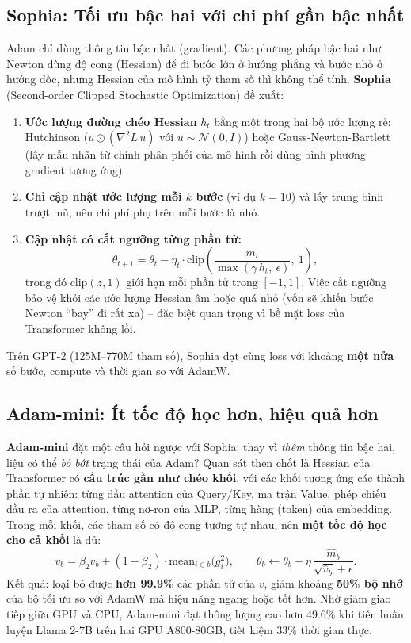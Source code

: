 \subsection{Sophia: Tối ưu bậc hai với chi phí gần bậc nhất}
\label{ssec:sophia}
Adam chỉ dùng thông tin bậc nhất (gradient). Các phương pháp bậc hai như Newton dùng độ cong (Hessian) để đi bước lớn ở hướng phẳng và bước nhỏ ở hướng dốc, nhưng Hessian của mô hình tỷ tham số thì không thể tính. \textbf{Sophia} (Second-order Clipped Stochastic Optimization) \cite{liu2024sophia} đề xuất:
\begin{enumerate}
	\item \textbf{Ước lượng đường chéo Hessian} $h_t$ bằng một trong hai bộ ước lượng rẻ: Hutchinson ($u \odot (\nabla^2 L\, u)$ với $u \sim \mathcal{N}(0, I)$) hoặc Gauss-Newton-Bartlett (lấy mẫu nhãn từ chính phân phối của mô hình rồi dùng bình phương gradient tương ứng).
	\item \textbf{Chỉ cập nhật ước lượng mỗi $k$ bước} (ví dụ $k = 10$) và lấy trung bình trượt mũ, nên chi phí phụ trên mỗi bước là nhỏ.
	\item \textbf{Cập nhật có cắt ngưỡng từng phần tử:}
	\begin{equation}
		\theta_{t+1} = \theta_t - \eta_t \cdot \text{clip}\left(\frac{m_t}{\max(\gamma\, h_t,\ \epsilon)},\ 1\right),
	\end{equation}
	trong đó $\text{clip}(z, 1)$ giới hạn mỗi phần tử trong $[-1, 1]$. Việc cắt ngưỡng bảo vệ khỏi các ước lượng Hessian âm hoặc quá nhỏ (vốn sẽ khiến bước Newton “bay” đi rất xa) -- đặc biệt quan trọng vì bề mặt loss của Transformer không lồi.
\end{enumerate}
Trên GPT-2 (125M--770M tham số), Sophia đạt cùng loss với khoảng \textbf{một nửa} số bước, compute và thời gian so với AdamW.

\subsection{Adam-mini: Ít tốc độ học hơn, hiệu quả hơn}
\label{ssec:adam_mini}
\textbf{Adam-mini} \cite{zhang2025adammini} đặt một câu hỏi ngược với Sophia: thay vì \emph{thêm} thông tin bậc hai, liệu có thể \emph{bỏ bớt} trạng thái của Adam? Quan sát then chốt là Hessian của Transformer có \textbf{cấu trúc gần như chéo khối}, với các khối tương ứng các thành phần tự nhiên: từng đầu attention của Query/Key, ma trận Value, phép chiếu đầu ra của attention, từng nơ-ron của MLP, từng hàng (token) của embedding. Trong mỗi khối, các tham số có độ cong tương tự nhau, nên \textbf{một tốc độ học cho cả khối} là đủ:
\[
v_b = \beta_2 v_b + (1-\beta_2)\cdot \text{mean}_{i \in b}\big(g_i^2\big), \qquad \theta_b \leftarrow \theta_b - \eta\,\frac{\hat{m}_b}{\sqrt{\hat{v}_b} + \epsilon}.
\]
Kết quả: loại bỏ được \textbf{hơn 99.9\%} các phần tử của $v$, giảm khoảng \textbf{50\% bộ nhớ} của bộ tối ưu so với AdamW mà hiệu năng ngang hoặc tốt hơn. Nhờ giảm giao tiếp giữa GPU và CPU, Adam-mini đạt thông lượng cao hơn 49.6\% khi tiền huấn luyện Llama 2-7B trên hai GPU A800-80GB, tiết kiệm 33\% thời gian thực.

